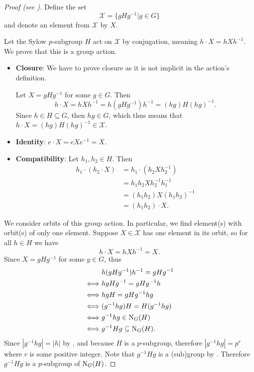 \begin{proof}[Proof (see {\cite[Theorem 11.10]{humphreys_1996}})]
    Define the set
    \[
        \mathcal{X} = \{gHg^{-1} \vert g \in G\}
    \]
    and denote an element from $\mathcal{X}$ by $X$.

    Let the Sylow $p$-subgroup $H$ act on $\mathcal{X}$ by conjugation, meaning $h \cdot X = hXh^{-1}$. We prove that this is a group action.

    \begin{itemize}
        \item \textbf{Closure}: We have to prove closure as it is not implicit in the action's definition.

        Let $X = gHg^{-1}$ for some $g \in G$. Then
        \[
            h\cdot X = hXh^{-1} = h(gHg^{-1})h^{-1} = (hg)H(hg)^{-1}.
        \]
        Since $h \in H \subseteq G$, then $hg \in G$, which thus means that $h \cdot X = (hg)H(hg)^{-1} \in \mathcal{X}$.
        \item \textbf{Identity}: $e \cdot X = eXe^{-1} = X$.
        \item \textbf{Compatibility}: Let $h_1, h_2 \in H$. Then
        \begin{align*}
            h_1 \cdot (h_2 \cdot X) &= h_1 \cdot (h_2Xh_2^{-1})\\
            &= h_1h_2Xh_2^{-1}h_1^{-1}\\
            &= (h_1h_2)X(h_1h_2)^{-1}\\
            &= (h_1h_2) \cdot X.
        \end{align*}
    \end{itemize}

    We consider orbits of this group action. In particular, we find element(s) with orbit(s) of only one element. Suppose $X \in \mathcal{X}$ has one element in its orbit, so for all $h \in H$ we have
    \[
        h\cdot X = hXh^{-1} = X.
    \]
    Since $X = gHg^{-1}$ for some $g \in G$, thus
    \begin{align*}
        &h(gHg^{-1})h^{-1} = gHg^{-1}\\
        \iff&hgHg^{-1} = gHg^{-1}h\\
        \iff&hgH = gHg^{-1}hg\\
        \iff&(g^{-1}hg)H = H(g^{-1}hg)\\
        \iff&g^{-1}hg \in \mathrm{N}_{G}(H)\\
        \iff&g^{-1}Hg \subseteq \mathrm{N}_{G}(H).
    \end{align*}
    Since $|g^{-1}hg| = |h|$ by , and because $H$ is a $p$-subgroup, therefore $|g^{-1}hg| = p^r$ where $r$ is some positive integer. Note that $g^{-1}Hg$ is a (sub)group by . Therefore $g^{-1}Hg$ is a $p$-subgroup of $\mathrm{N}_{G}(H)$.


\end{proof}
